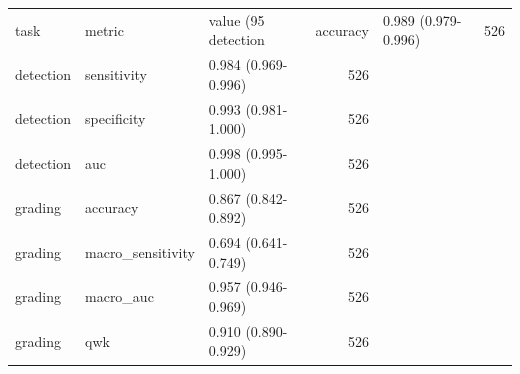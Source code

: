 \begin{tabular}{lllr}
\toprule
task & metric & value (95%
\midrule
detection & accuracy & 0.989 (0.979-0.996) & 526 \\
detection & sensitivity & 0.984 (0.969-0.996) & 526 \\
detection & specificity & 0.993 (0.981-1.000) & 526 \\
detection & auc & 0.998 (0.995-1.000) & 526 \\
grading & accuracy & 0.867 (0.842-0.892) & 526 \\
grading & macro_sensitivity & 0.694 (0.641-0.749) & 526 \\
grading & macro_auc & 0.957 (0.946-0.969) & 526 \\
grading & qwk & 0.910 (0.890-0.929) & 526 \\
\bottomrule
\end{tabular}
